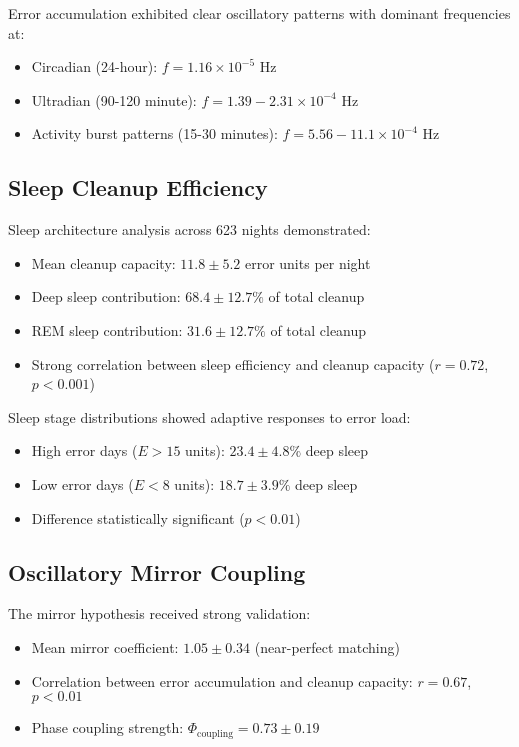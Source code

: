 \documentclass[12pt]{article}
\begin{document}
Error accumulation exhibited clear oscillatory patterns with dominant frequencies at:
\begin{itemize}
\item Circadian (24-hour): $f = 1.16 \times 10^{-5}$ Hz
\item Ultradian (90-120 minute): $f = 1.39-2.31 \times 10^{-4}$ Hz
\item Activity burst patterns (15-30 minutes): $f = 5.56-11.1 \times 10^{-4}$ Hz
\end{itemize}

\subsection{Sleep Cleanup Efficiency}

Sleep architecture analysis across 623 nights demonstrated:
\begin{itemize}
\item Mean cleanup capacity: $11.8 \pm 5.2$ error units per night
\item Deep sleep contribution: $68.4 \pm 12.7\%$ of total cleanup
\item REM sleep contribution: $31.6 \pm 12.7\%$ of total cleanup
\item Strong correlation between sleep efficiency and cleanup capacity ($r = 0.72$, $p < 0.001$)
\end{itemize}

Sleep stage distributions showed adaptive responses to error load:
\begin{itemize}
\item High error days ($E > 15$ units): $23.4 \pm 4.8\%$ deep sleep
\item Low error days ($E < 8$ units): $18.7 \pm 3.9\%$ deep sleep
\item Difference statistically significant ($p < 0.01$)
\end{itemize}

\subsection{Oscillatory Mirror Coupling}

The mirror hypothesis received strong validation:
\begin{itemize}
\item Mean mirror coefficient: $1.05 \pm 0.34$ (near-perfect matching)
\item Correlation between error accumulation and cleanup capacity: $r = 0.67$, $p < 0.01$
\item Phase coupling strength: $\Phi_{\text{coupling}} = 0.73 \pm 0.19$
\end{itemize}
\end{document}
